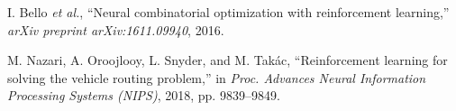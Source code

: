 \documentclass[journal]{IEEEtran}
\begin{document}
\begin{thebibliography}{1}
        I. Bello \emph{et al.}, ``Neural combinatorial optimization with reinforcement learning,'' \emph{arXiv preprint arXiv:1611.09940}, 2016.

         M. Nazari, A. Oroojlooy, L. Snyder, and M. Takác, ``Reinforcement learning for solving the vehicle routing problem,'' in \emph{Proc. Advances Neural Information Processing Systems (NIPS)}, 2018, pp. 9839--9849.























\end{thebibliography}
\end{document}
